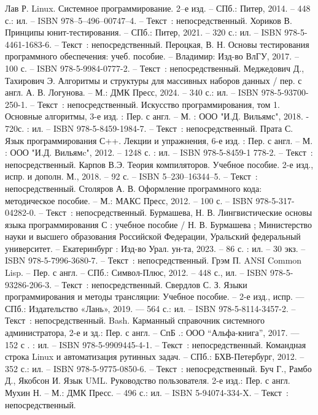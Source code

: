 \begin{thebibliography}{9}
		Лав Р. Linux. Системное программирование. 2–е изд. -- СПб.: Питер, 2014. -- 448 с.: ил. – ISBN 978–5–496–00747–4. -- Текст~: непосредственный.
		Хориков В. Принципы юнит-тестирования. -- СПб.: Питер, 2021. -- 320 с.: ил. -- ISBN 978-5-4461-1683-6. -- Текст~: непосредственный.
	 Пероцкая, В. Н. Основы тестирования программного обеспечения: учеб. пособие. -- Владимир: Изд-во ВлГУ, 2017. – 100 с. -- ISBN 978-5-9984-0777-2. -- Текст~: непосредственный.
	 Меджедович Д., Тахирович Э. Алгоритмы и структуры для массивных наборов данных / пер. с англ. А. В. Логунова. -- М.: ДМК Пресс, 2024. -- 340 с.: ил. -- ISBN 978-5-93700-250-1. -- Текст~: непосредственный.
	 Искусство программирования, том 1. Основные алгоритмы, 3-е изд. : Пер. с англ. -- М. : ООО "И.Д. Вильямс", 2018. - 720с. : ил. -- ISBN 978-5-8459-1984-7. -- Текст~: непосредственный.
	 Прата С. Язык программирования С++. Лекции и упражнения, 6-е изд. : Пер. с англ. -- М. : ООО "И.Д. Вильямc", 2012. -- 1248 с. : ил. -- ISBN 978-5-8459-1 778-2. -- Текст~: непосредственный.
	 Карпов В.Э. Теория компиляторов. Учебное пособие. 2-е изд., испр. и дополн. М., 2018. -- 92 с. -- ISBN 5–230–16344–5. -- Текст~: непосредственный.
	 Столяров А. В. Оформление программного кода: методическое пособие. -- М.: МАКС Пресс, 2012. -- 100 с. -- ISBN 978-5-317-04282-0. -- Текст~: непосредственный.
	 Бурмашева, Н. В. Лингвистические основы языка программирования С : учебное пособие / Н. В. Бурмашева ; Министерство науки и высшего образования Российской Федерации, Уральский федеральный университет. -- Екатеринбург : Изд-во Урал. ун-та, 2023. -- 86 с. : ил. -- 30 экз. -- ISBN 978-5-7996-3680-7. -- Текст~: непосредственный.
	 Грэм П. ANSI Common Lisp. -- Пер. с англ. -- СПб.: Символ-Плюс, 2012. -- 448 с., ил. -- ISBN 978-5-93286-206-3. -- Текст~: непосредственный.
	 Свердлов С. З. Языки программирования и методы трансляции: Учебное пособие. -- 2-е изд., испр. — СПб.: Издательство «Лань», 2019. — 564 с.: ил. -- ISBN 978-5-8114-3457-2. -- Текст~: непосредственный.
	 Bash. Карманный справочник системного администратора, 2-е и зд.: Пер. с англ. -- СпБ .: ООО “Альфа-книга”, 2017. — 152 с . : ил. -- ISBN 978-5-9909445-4-1. -- Текст~: непосредственный.
	 Командная строка Linux и автоматизация рутинных задач. -- СПб.: БХВ-Петербург, 2012. -- 352 с.: ил. -- ISBN 978-5-9775-0850-6. -- Текст~: непосредственный.
	 Буч Г., Рамбо Д., Якобсон И. Язык UML. Руководство пользователя. 2-е изд.: Пер. с англ. Мухин Н. – М.: ДМК Пресс. – 496 с.: ил. -- ISBN 5-94074-334-X. -- Текст~: непосредственный.

\end{thebibliography}
